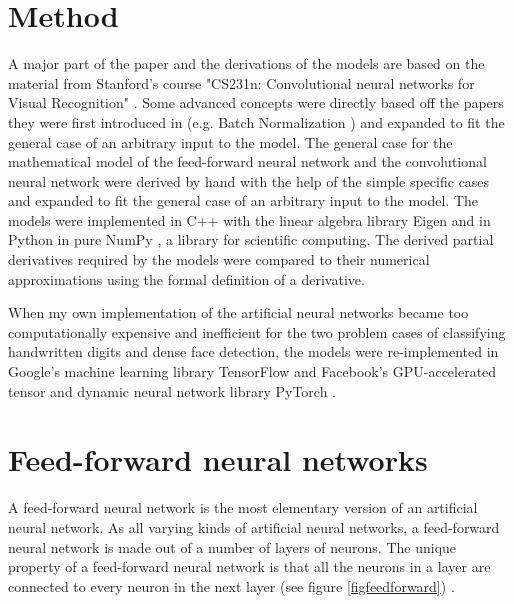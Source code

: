 \documentclass[a4paper, twoside]{article}
\begin{document}
\section{Method}
A major part of the paper and the derivations of the models are based on the material from Stanford's course "CS231n: Convolutional neural networks for Visual Recognition" \cite{cs231n} . Some advanced concepts were directly based off the papers they were first introduced in (e.g. Batch Normalization \cite{batchnorm}) and expanded to fit the general case of an arbitrary input to the model. The general case for the mathematical model of the feed-forward neural network and the convolutional neural network were derived by hand with the help of the simple specific cases and expanded to fit the general case of an arbitrary input to the model. The models were implemented in C++ with the linear algebra library Eigen \cite{eigen} and in Python in pure NumPy \cite{numpy}, a library for scientific computing. The derived partial derivatives required by the models were compared to their numerical approximations using the formal definition of a derivative.  

When my own implementation of the artificial neural networks became too computationally expensive and inefficient for the two problem cases of classifying handwritten digits and dense face detection, the models were re-implemented in Google's machine learning library TensorFlow \cite{tensorflow} and Facebook's GPU-accelerated tensor and dynamic neural network library PyTorch \cite{pytorch}.  

\section{Feed-forward neural networks}
A feed-forward neural network is the most elementary version of an artificial neural network. As all varying kinds of artificial neural networks, a feed-forward neural network is made out of a number of layers of neurons. The unique property of a feed-forward neural network is that all the neurons in a layer are connected to every neuron in the next layer (see figure \ref{figfeedforward}) \cite{cs231n}.
\end{document}
